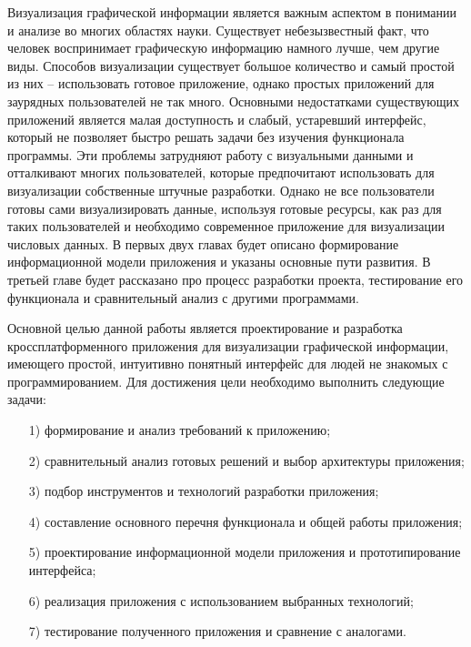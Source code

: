 \intro
Визуализация графической информации является важным аспектом в понимании и анализе во многих областях науки. Существует небезызвестный факт, что человек воспринимает графическую информацию намного лучше, чем другие виды. Способов визуализации существует большое количество и самый простой из них -- использовать готовое приложение, однако простых приложений для заурядных пользователей не так много. Основными недостатками существующих приложений является малая доступность и слабый, устаревший интерфейс, который не позволяет быстро решать задачи без изучения функционала программы. Эти проблемы затрудняют работу с визуальными данными и отталкивают многих пользователей, которые предпочитают использовать для визуализации собственные штучные разработки. Однако не все пользователи готовы сами визуализировать данные, используя готовые ресурсы, как раз для таких пользователей и необходимо современное приложение для визуализации числовых данных. В первых двух главах будет описано формирование информационной модели приложения и указаны основные пути развития. В третьей главе будет рассказано про процесс разработки проекта, тестирование его функционала и сравнительный анализ с другими программами.

Основной целью данной работы является проектирование и разработка кроссплатформенного приложения для визуализации графической информации, имеющего простой, интуитивно понятный интерфейс для людей не знакомых с программированием.
Для достижения цели необходимо выполнить следующие задачи:
\begin{enumerate}
    \item [1)] формирование и анализ требований к приложению;
    \item [2)] сравнительный анализ готовых решений и выбор архитектуры приложения;
    \item [3)] подбор инструментов и технологий разработки приложения;
    \item [4)] составление основного перечня функционала и общей работы приложения;
    \item [5)] проектирование информационной модели приложения и прототипирование интерфейса;
    \item [6)] реализация приложения с использованием выбранных технологий;
    \item [7)] тестирование полученного приложения и сравнение с аналогами.
\end{enumerate}



